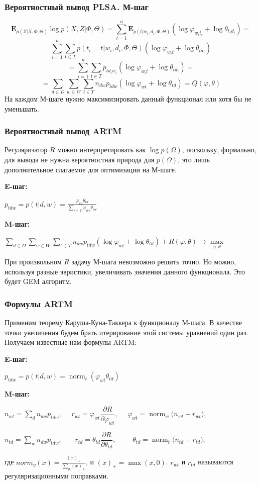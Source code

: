 \documentclass[utf8]{beamer}
\DeclareMathOperator{\norm}{norm}
\renewcommand{\phi}{\varphi}
\begin{document}
	 	\begin{frame}
		\frametitle{Вероятностный вывод PLSA. М-шаг}   
\[
\mathbf{E}_{p(Z|X,\Phi, \Theta)} \log p(X,Z|\Phi,\Theta) = 
\sum_{i=1}^{n} \mathbf{E}_{p(t|w_{i}, d_{i}, \Phi, \Theta)} (\log \phi_{w_{i} t_{i}} + \log \theta_{t_{i} d_{i}}) =
\]
\[
= \sum_{i=1}^{n} \sum_{t \in T} p(t_{i}=t|w_{i}, d_{i},\Phi,\Theta) (\log \phi_{w_{i} t} + \log \theta_{td_{i}}) =
\]
\[
= \sum_{i=1}^{n} \sum_{t \in T} p_{td_{i}w_{i}} (\log \phi_{w_{i} t} + \log \theta_{td_i}) =
\]
\[
=\sum_{d\in D}\sum_{w \in W} \sum_{t \in T} n_{dw} p_{tdw} (\log \phi_{wt} + \log \theta_{td}) = Q(\phi, \theta)
\]
На каждом М-шаге нужно максимизировать данный функционал или хотя бы не уменьшать.
	\end{frame}
	
	\begin{frame}
	\frametitle{Вероятностный вывод ARTM}
	Регуляризатор $R$ можно интерпретировать как $\log p(\Omega)$, поскольку, формально, для вывода не нужна вероятностная природа для $p(\Omega)$, это лишь дополнительное слагаемое для оптимизации на М-шаге.
	\medskip
	
	\textbf{E-шаг:}	
   		 
   		 \qquad $p_{tdw} = p(t|d, w) = \frac{\phi_{wt} \theta_{td}}{\sum\limits_{s\in T} \phi_{ws} \theta_{sd}}$ 		 
 		\medskip
 		
 	\textbf{M-шаг:}
 	
   		 
   		 \qquad $\sum\limits_{d\in D}\sum\limits_{w \in W} \sum\limits_{t \in T} n_{dw} p_{tdw} (\log \phi_{wt} + \log \theta_{td})  + R(\phi,\theta) \to \max\limits_{\phi,\theta}$
   	\medskip
   		 
	При произвольном $R$ задачу М-шага невозможно решить точно. Но можно, используя разные эвристики, увеличивать значения данного функционала. Это будет GEM алгоритм.
	\end{frame}
	
 	\begin{frame}
		\frametitle{Формулы ARTM}   
		Применим теорему Каруша-Куна-Таккера к функционалу М-шага. В качестве точки увеличения будем брать итерирование этой системы уравнений один раз. Получаем известные нам формулы ARTM:
		\medskip
		
   		\textbf{E-шаг:}	
   		 
   		 \qquad $p_{tdw} = p(t|d, w) = \norm_t(\varphi_{wt} \theta_{td})$ 		 
 		\medskip
 		
 		\textbf{M-шаг:}
    
 		\qquad $n_{wt} = \sum\limits_{d} n_{dw} p_{tdw}$,\ \ \ $r_{wt} =  \phi_{wt}\dfrac{\partial R}{\partial\phi_{wt}}$,\ \ \  $\phi_{wt}   = \norm_w\big(n_{wt} + r_{wt}\big)$,

 		\qquad $n_{td} = \sum\limits_{w} n_{dw} p_{tdw}$,\ \ \  \ $r_{td} =  \theta_{td}\dfrac{\partial R}{\partial\theta_{td}}$,\ \ \ \ \ $\theta_{td} = \norm_t  \big(n_{td} + r_{td}\big)$,
\medskip

	где $norm_y(x) = \frac{(x)_{+}}{\sum\limits_y (x)_{+}}$, и $(x)_{+} = \max(x, 0)$. $r_{wt}$ и $r_{td}$ называются регуляризационными поправками. 
	\end{frame}
\end{document}
